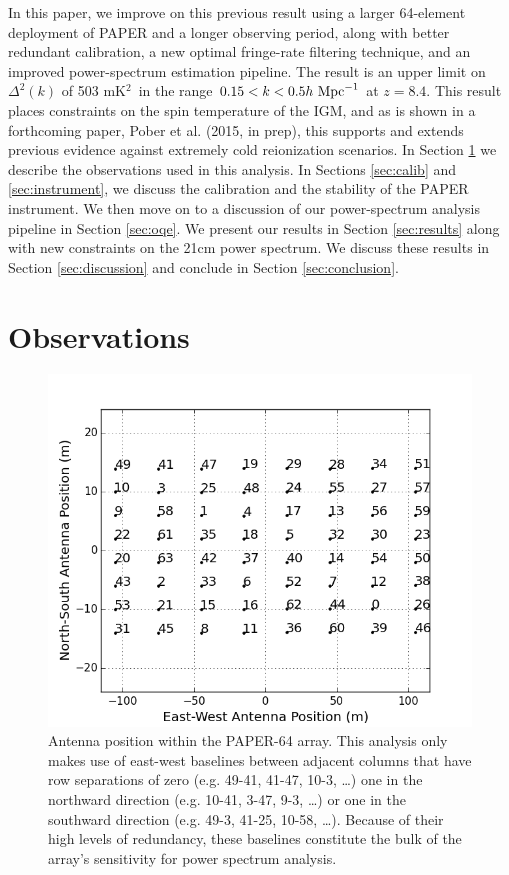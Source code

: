 \documentclass[twocolumn,numberedappendix]{emulateapj} \shorttitle{New Limits on the 21 cm Power Spectrum at $z=8.4$}
\newcommand{\hMpci}{h\ {\rm Mpc}^{-1}}
\newcommand{\mKsqlimit}{503 mK$^2$}
\newcommand{\pobercitet}{Pober et al. (2015, in prep)}
\begin{document}
In this paper, we improve on this previous result using
a larger 64-element deployment of PAPER and a longer observing period, along with better redundant calibration, a new
optimal fringe-rate filtering technique, and an improved power-spectrum estimation pipeline.
The result is an
upper limit on $\Delta^2(k)$ of \mKsqlimit~in the range
$0.15<k<0.5\hMpci$ at $z=8.4$.  This result places constraints on the 
spin temperature of the IGM, and as is shown in a forthcoming paper,
\pobercitet, this supports and extends
previous evidence against extremely cold reionization scenarios.
In Section
\ref{sec:observations} we describe the observations used in this analysis. In
Sections \ref{sec:calib} and \ref{sec:instrument}, 
we discuss the calibration and 
the stability of the PAPER instrument.
We then move on to a discussion of our power-spectrum analysis pipeline in Section
\ref{sec:oqe}. 
We present our results in Section
\ref{sec:results} along with new constraints on the 21cm power spectrum.
We discuss these results in Section \ref{sec:discussion} and conclude in Section \ref{sec:conclusion}.



\section{Observations}\label{sec:observations}

\begin{figure}\centering
\includegraphics[width=\columnwidth]{plots/antenna_positions.png}
\caption{
Antenna position within the PAPER-64 array.
This analysis only makes use of
east-west baselines between adjacent columns that have row
separations of zero (e.g. 49-41, 41-47, 10-3, \dots)
one in the northward direction (e.g. 10-41, 3-47, 9-3, \dots) or
one in the southward direction (e.g. 49-3, 41-25, 10-58, \dots).
Because of their high levels of redundancy, 
these baselines constitute the bulk of the array's sensitivity for power
spectrum analysis.}
\label{fig:antenna_positions}
\end{figure}
\end{document}
